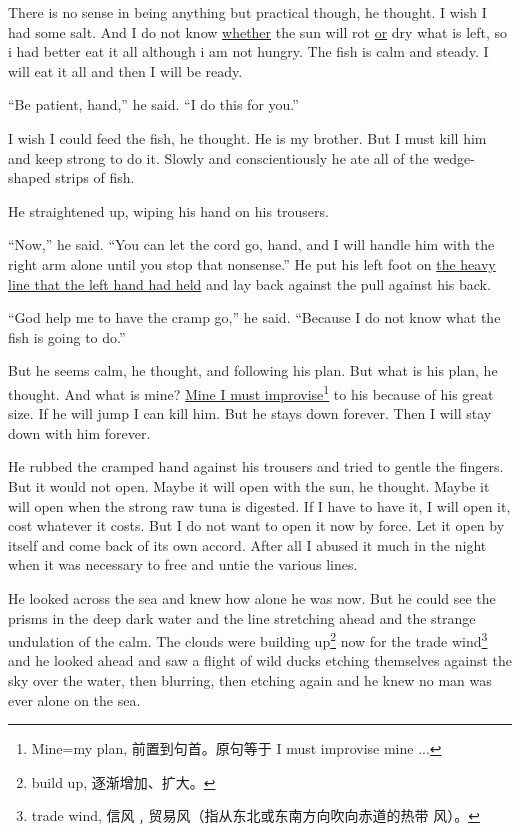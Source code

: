 \documentclass[fontset=ubuntu]{ctexrep}
\begin{document}
There is no sense in being anything but \gls{practical} though, he thought. I wish
I had some salt. And I do not know \uline{whether} the sun will \gls{rot} \uline{or} dry
what is left, so i had better eat it all although i am not hungry. The fish
is calm and steady. I will eat it all and then I will be ready.

``Be patient, hand,'' he said. ``I do this for you.''

I wish I could feed the fish, he thought. He is my brother. But I must kill
him and keep strong to do it. Slowly and \gls{conscientiously} he ate all of
the wedge-shaped strips of fish.

He straightened up, wiping his hand on his trousers.

``Now,'' he said. ``You can let the cord go, hand, and I will handle him
with the right arm alone until you stop that \gls{nonsense}.'' He put his
left foot on \uline{the heavy line that the left hand had held} and lay back
against the pull against his back.

``God help me to have the cramp go,'' he said. ``Because I do not know what
the fish is going to do.''

But he seems calm, he thought, and following his plan. But what is his plan,
he thought. And what is mine? \uline{Mine I must improvise}\footnote{Mine=my
  plan, 前置到句首。原句等于 I must improvise mine ...} to his because of
his great size. If he will jump I can kill him. But he stays down forever.
Then I will stay down with him forever.

He \gls{rubbed} the cramped hand against his trousers and tried to gentle the
fingers. But it would not open. Maybe it will open with the sun, he thought.
Maybe it will open when the strong raw tuna is \gls{digested}. If I have to
have it, I will open it, cost whatever it costs. But I do not want to open
it now by force. Let it open by itself and come back of its own
\gls{accord}. After all I \gls{abused} it much in the night when it was
necessary to free and \gls{untie} the \gls{various} lines.

He looked across the sea and knew how alone he was now. But he could see the
prisms in the deep dark water and the line \gls{stretching} ahead and the
strange \gls{undulation} of the calm. The clouds were building
up\footnote{build up, 逐渐增加、扩大。} now for the trade
wind\footnote{trade wind, 信风﹐贸易风（指从东北或东南方向吹向赤道的热带
  风）。} and he looked ahead and saw a \gls{flight} of wild ducks \gls{etching}
themselves against the sky over the water, then \gls{blurring}, then etching again
and he knew no man was ever alone on the sea.
\end{document}
